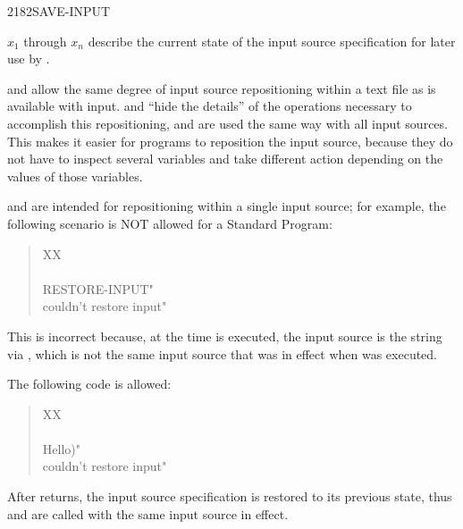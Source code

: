 \begin{newword}{2182}{SAVE-INPUT}

	$x_1$ through $x_n$ describe the current state of the input
	source specification for later use by .

	\begin{rationale} %
		 and  allow the same
		degree of input source repositioning within a text file as is
		available with  input. 
		and  ``hide the details'' of the operations
		necessary to accomplish this repositioning, and are used the
		same way with all input sources. This makes it easier for
		programs to reposition the input source, because they do not
		have to inspect several variables and take different action
		depending on the values of those variables.

		 and  are intended for
		repositioning within a single input source; for example, the
		following scenario is NOT allowed for a Standard Program:

		\begin{quote}\ttfamily
			\word{:} XX \\
			\tab {} ~  \\
			\tab {} RESTORE-INPUT"  \\
			\tab {} couldn't restore input" \\
			\word{;}
		\end{quote}

		This is incorrect because, at the time  is
		executed, the input source is the string via ,
		which is not the same input source that was in effect when
		 was executed.

		The following code is allowed:

		\begin{quote}\ttfamily
			\word{:} XX \\
			\tab {} ~  \\
			\tab {}  Hello)"  \\
			\tab {}  couldn't restore input" \\
			\word{;}
		\end{quote}

		After  returns, the input source specification
		is restored to its previous state, thus  and
		 are called with the same input source in
		effect.


\end{rationale}
\end{newword}
